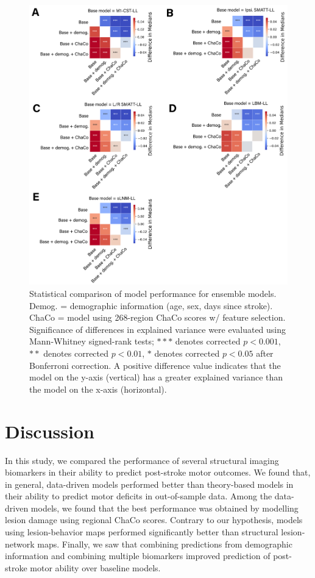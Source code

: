 \documentclass[10pt]{article}
\begin{document}
\begin{figure}[htp]
\centering
\includegraphics[width=1\linewidth]{figures/Analysis2_matrix_annot.png}
\caption{Statistical comparison of model performance for ensemble models. Demog. = demographic information (age, sex, days since stroke). ChaCo = model using 268-region ChaCo scores w/ feature selection. Significance of differences in explained variance were evaluated using Mann-Whitney signed-rank tests; $***$ denotes corrected $p < 0.001$, $**$ denotes corrected $p < 0.01$, $*$ denotes corrected $p < 0.05$ after Bonferroni correction. A positive difference value indicates that the model on the y-axis (vertical) has a greater explained variance than the model on the x-axis (horizontal).}
\label{analysis2_matrix}
\end{figure}

\section{Discussion}
In this study, we compared the performance of several structural imaging biomarkers in their ability to predict post-stroke motor outcomes. We found that, in general, data-driven models performed better than theory-based models in their ability to predict motor deficits in out-of-sample data. Among the data-driven models, we found that the best performance was obtained by modelling lesion damage using regional ChaCo scores. Contrary to our hypothesis, models using lesion-behavior maps performed significantly better than structural lesion-network maps. Finally, we saw that combining predictions from demographic information and combining multiple biomarkers improved prediction of post-stroke motor ability over baseline models.
\end{document}
